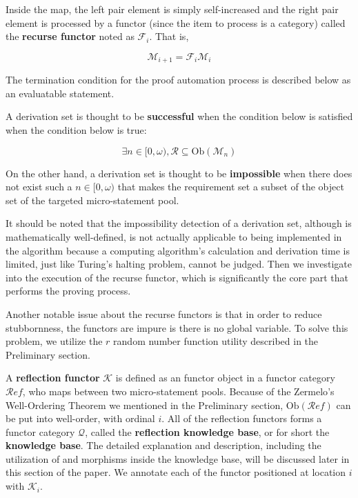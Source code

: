 \documentclass{article}
\begin{document}
Inside the map, the left pair element is simply self-increased and the right pair element is processed by a functor (since the item to process is a category) called the \textbf{ recurse functor} noted as \(\mathcal{F}_i\). That is,

\[\mathcal{M}_{i+1}=\mathcal{F}_i\mathcal{M}_i\]

The termination condition for the proof automation process is described below as an evaluatable statement. 

 A derivation set is thought to be \textbf{ successful} when the condition below is satisfied when the condition below is true:

\[\exists n\in [0,\omega ), \mathcal{R}\subseteq \text{Ob}\left(\mathcal{M}_n\right)\]

On the other hand, a derivation set is thought to be \textbf{ impossible} when there does not exist such a \(n\in [0,\omega )\) that makes the requirement set a subset of the object set of the targeted micro-statement pool.

It should be noted that the impossibility detection of a derivation set, although is mathematically well-defined, is not actually applicable to being implemented in the algorithm because a computing algorithm{'}s calculation and derivation time is limited, just like Turing{'}s halting problem, cannot be judged. Then we investigate into the execution of the recurse functor, which is significantly the core part that performs the proving process.

Another notable issue about the recurse functors is that in order to reduce stubbornness, the functors are impure is there is no global variable. To solve this problem, we utilize the \(\mathit{r}\) random number function utility described in the Preliminary section.

A \textbf{ reflection functor} \(\mathcal{K}\) is defined as an functor object in a functor category \(\mathcal{R}\mathit{e}\mathit{f}\), who maps between two micro-statement pools. Because of the Zermelo{'}s Well-Ordering Theorem we mentioned in the Preliminary section, \(\text{Ob}(\mathcal{R}\mathit{e}\mathit{f})\) can be put into well-order, with ordinal \(i\). All of the reflection functors forms a functor category \(\mathcal{Q}\), called the \textbf{ reflection knowledge base}, or for short the \textbf{ knowledge base}. The detailed explanation and description, including the utilization of and morphisms inside the knowledge base, will be discussed later in this section of the paper. We annotate each of the functor positioned at location \(i\) with \(\mathcal{K}_i\).
\end{document}
